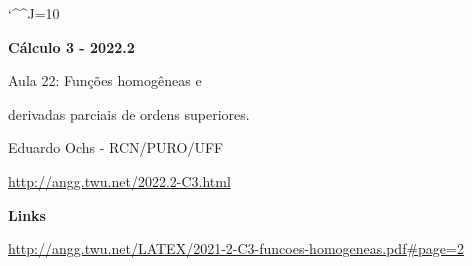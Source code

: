 \documentclass[oneside,12pt]{article}
\begin{document}
\catcode`\^^J=10
\pu
\def\pictgridstyle{\color{GrayPale}\linethickness{0.3pt}}
\def\pictaxesstyle{\linethickness{0.5pt}}
\def\pictnaxesstyle{\color{GrayPale}\linethickness{0.5pt}}
\celllower=2.5pt


\def\u#1{\par{\footnotesize \url{#1}}}

\def\drafturl{http://angg.twu.net/LATEX/2022-2-C3.pdf}
\def\drafturl{http://angg.twu.net/2022.2-C3.html}
\def\draftfooter{\tiny \href{\drafturl}{\jobname{}} \ColorBrown{\shorttoday{} \hours}}



%

\thispagestyle{empty}

\begin{center}

\vspace*{1.2cm}

{\bf \Large Cálculo 3 - 2022.2}

\bsk

Aula 22: Funções homogêneas e

derivadas parciais de ordens superiores.

\bsk

Eduardo Ochs - RCN/PURO/UFF

\url{http://angg.twu.net/2022.2-C3.html}

\end{center}

\newpage


{\bf Links}

\ssk

{\scriptsize

\url{http://angg.twu.net/LATEX/2021-2-C3-funcoes-homogeneas.pdf#page=2}

}
\end{document}

